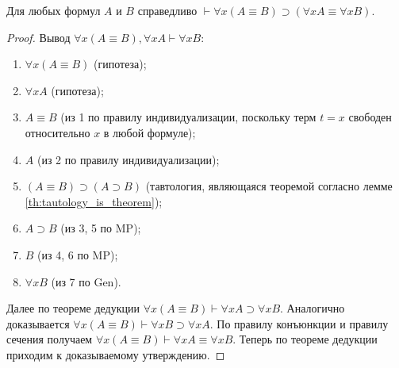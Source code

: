 \begin{lemma}\label{th:equivalence_distribution}
    Для любых формул $A$ и $B$ справедливо $\vdash \forall x(A \equiv B) \supset (\forall xA \equiv \forall xB)$.
\end{lemma}
\begin{proof}
    Вывод $\forall x(A \equiv B), \forall xA \vdash \forall xB$: 
    \begin{enumerate}
        \item $\forall x(A \equiv B)$ (гипотеза);
        \item $\forall xA$ (гипотеза);
        \item $A \equiv B$ (из 1 по правилу индивидуализации, поскольку терм $t = x$ свободен относительно $x$ в любой формуле);
        \item $A$ (из 2 по правилу индивидуализации);
        \item $(A \equiv B) \supset (A \supset B)$ (тавтология, являющаяся теоремой согласно лемме \ref{th:tautology_is_theorem});
        \item $A \supset B$ (из 3, 5 по MP);
        \item $B$ (из 4, 6 по MP);
        \item $\forall xB$ (из 7 по Gen).
    \end{enumerate}
    Далее по теореме дедукции $\forall x(A \equiv B) \vdash \forall xA \supset \forall xB$. Аналогично доказывается $\forall x(A \equiv B) \vdash \forall xB \supset \forall xA$. По правилу конъюнкции и правилу сечения получаем $\forall x(A \equiv B) \vdash \forall xA \equiv \forall xB$. Теперь по теореме дедукции приходим к доказываемому утверждению.
\end{proof}

